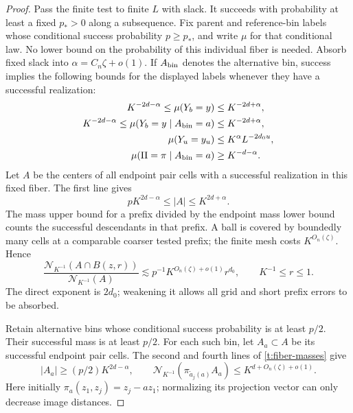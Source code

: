 \begin{proof}
Pass the finite test to finite $L$ with slack.  It succeeds with
probability at least a fixed $p_*>0$ along a subsequence.  Fix parent
and reference-bin labels whose conditional success probability
$p\ge p_*$, and write $\mu$ for that conditional law.  No lower bound
on the probability of this individual fiber is needed.  Absorb fixed
slack into $\alpha=C_n\zeta+o(1)$.  If $A_{\rm bin}$ denotes the
alternative bin, success implies the following bounds for the displayed
labels whenever they have a successful realization:
\begin{equation}\label{t:fiber-masses}
 \begin{split}
 K^{-2d-\alpha}\le\mu(Y_b=y)&\le K^{-2d+\alpha},\\
 K^{-2d-\alpha}\le\mu(Y_b=y\mid A_{\rm bin}=a)
       &\le K^{-2d+\alpha},\\
 \mu(Y_u=y_u)&\le K^\alpha L^{-2d_0u},\\
 \mu(\Pi=\pi\mid A_{\rm bin}=a)&\ge K^{-d-\alpha}.
 \end{split}
\end{equation}
Let $A$ be the centers of all endpoint pair cells with a successful
realization in this fixed fiber.  The first line gives
\begin{equation}\label{t:common-planar-set}
 pK^{2d-\alpha}\le|A|\le K^{2d+\alpha}.
\end{equation}
The mass upper bound for a prefix divided by the endpoint mass lower
bound counts the successful descendants in that prefix.  A ball is
covered by boundedly many cells at a comparable coarser tested prefix;
the finite mesh costs $K^{O_n(\zeta)}$.  Hence
\begin{equation}\label{t:planar-nonconcentration}
 \frac{\mathcal N_{K^{-1}}(A\cap B(z,r))}
      {\mathcal N_{K^{-1}}(A)}
 \lesssim p^{-1}K^{O_n(\zeta)+o(1)}r^{d_0},
                 \qquad K^{-1}\le r\le1.
\end{equation}
The direct exponent is $2d_0$; weakening it allows all grid and short
prefix errors to be absorbed.

Retain alternative bins whose conditional success probability is at
least $p/2$.  Their successful mass is at least $p/2$.  For each such
bin, let $A_a\subset A$ be its successful endpoint pair cells.  The
second and fourth lines of \eqref{t:fiber-masses} give
\begin{equation}\label{t:large-subsets}
 |A_a|\ge(p/2)K^{2d-\alpha},\qquad
 \mathcal N_{K^{-1}}(\pi_{\widetilde a_j(a)}A_a)
       \le K^{d+O_n(\zeta)+o(1)}.
\end{equation}
Here initially $\pi_a(z_1,z_j)=z_j-az_1$; normalizing its projection
vector can only decrease image distances.


\end{proof}
